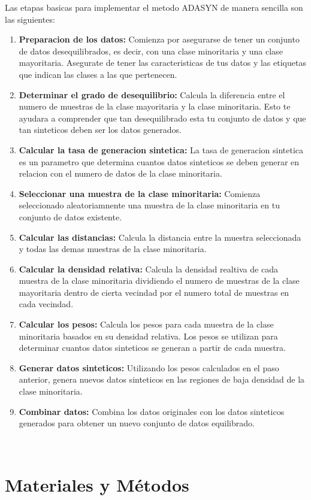 \documentclass[12pt]{article}
\begin{document}
Las etapas basicas para implementar el metodo ADASYN de manera sencilla son las siguientes:
\begin{enumerate}
    \item \textbf{Preparacion de los datos:} Comienza por asegurarse de tener un conjunto de datos desequilibrados, es decir, con una clase minoritaria y una clase mayoritaria. Asegurate de tener las caracteristicas de tus datos y las etiquetas que indican las clases a las que pertenecen.
    \item \textbf{Determinar el grado de desequilibrio:} Calcula la diferencia entre el numero de muestras de la clase mayoritaria y la clase minoritaria. Esto te ayudara a comprender que tan desequilibrado esta tu conjunto de datos y que tan sinteticos deben ser los datos generados.
    \item \textbf{Calcular la tasa de generacion sintetica: } La tasa de generacion sintetica es un parametro que determina cuantos datos sinteticos se deben generar en relacion con el numero de datos de la clase minoritaria.
    \item \textbf{Seleccionar una muestra de la clase minoritaria: } Comienza seleccionado aleatoriamnente una muestra de la clase minoritaria en tu conjunto de datos existente.
    \item \textbf{Calcular las distancias:} Calcula la distancia entre la muestra seleccionada y todas las demas muestras de la clase minoritaria.
    \item \textbf{Calcular la densidad relativa: } Calcula la densidad realtiva de cada muestra de la clase minoritaria dividiendo el numero de muestras de la clase mayoritaria dentro de cierta vecindad por el numero total de muestras en cada vecindad.
    \item \textbf{Calcular los pesos: } Calcula los pesos para cada muestra de la clase minoritaria basados en su densidad relativa. Los pesos se utilizan para determinar cuantos datos sinteticos se generan a partir de cada muestra.
    \item \textbf{Generar datos sinteticos: }Utilizando los pesos calculados en el paso anterior, genera nuevos datos sinteticos en las regiones de baja densidad de la clase minoritaria.
    \item \textbf{Combinar datos:} Combina los datos originales con los  datos sinteticos generados para obtener un nuevo conjunto de datos equilibrado.
\end{enumerate}
~\cite{De0a100enIA}

\section{Materiales y Métodos}
\end{document}
